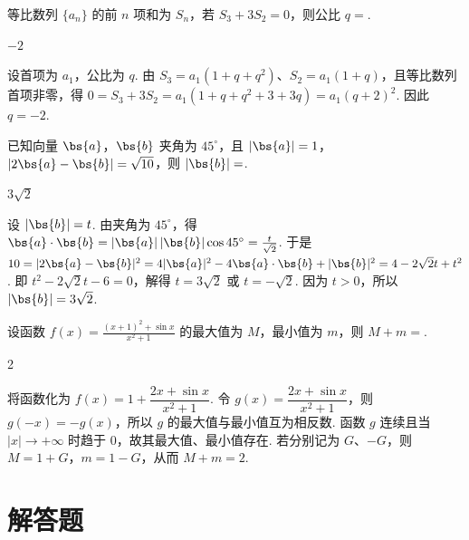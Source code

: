 \begin{problem}
等比数列 \(\{a_{n}\}\) 的前 \(n\) 项和为 \(S_{n}\)，若 \(S_{3} + 3S_{2} = 0\)，则公比 \(q = \)\fillinblank{}.

\begin{answer}
\(-2\)
\end{answer}

\begin{solution}
设首项为 \(a_1\)，公比为 \(q\). 由 \(S_3=a_1(1+q+q^2)\)、\(S_2=a_1(1+q)\)，且等比数列首项非零，得
\(0=S_3+3S_2=a_1(1+q+q^2+3+3q)=a_1(q+2)^2\). 因此 \(q=-2\).
\end{solution}
\end{problem}

\begin{problem}
已知向量 \(\bs{a}\)，\(\bs{b}\) 夹角为 \(45^{\circ}\)，且 \(|\bs{a}| = 1\)，\(|2\bs{a} - \bs{b}| = \sqrt{10}\)，则 \(|\bs{b}| = \)\fillinblank{}.

\begin{answer}
\(3\sqrt{2}\)
\end{answer}

\begin{solution}
设 \(|\bs{b}|=t\). 由夹角为 \(45^{\circ}\)，得 \(\bs{a}\cdot\bs{b}=|\bs{a}|\,|\bs{b}|\cos45^{\circ}=\frac{t}{\sqrt2}\). 于是
\(10=|2\bs{a}-\bs{b}|^2=4|\bs{a}|^2-4\bs{a}\cdot\bs{b}+|\bs{b}|^2=4-2\sqrt2t+t^2\). 即 \(t^2-2\sqrt2t-6=0\)，解得 \(t=3\sqrt2\) 或 \(t=-\sqrt2\). 因为 \(t>0\)，所以 \(|\bs{b}|=3\sqrt2\).
\end{solution}
\end{problem}

\begin{problem}
设函数 \( f(x) = \frac{(x + 1)^2 + \sin x}{x^2 + 1} \) 的最大值为 \(M\)，最小值为 \( m \)，则 \( M + m = \)\fillinblank{}.

\begin{answer}
2
\end{answer}

\begin{solution}
将函数化为 \(f(x)=1+\dfrac{2x+\sin x}{x^2+1}\). 令 \(g(x)=\dfrac{2x+\sin x}{x^2+1}\)，则 \(g(-x)=-g(x)\)，所以 \(g\) 的最大值与最小值互为相反数. 函数 \(g\) 连续且当 \(|x|\to+\infty\) 时趋于 \(0\)，故其最大值、最小值存在. 若分别记为 \(G\)、\(-G\)，则 \(M=1+G\)，\(m=1-G\)，从而 \(M+m=2\).
\end{solution}
\end{problem}

\section{解答题}

